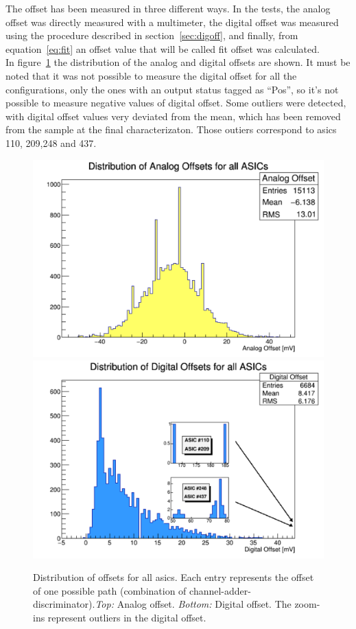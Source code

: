 \documentclass[main.tex]{subfiles}
\begin{document}
The offset has been measured in three different ways. In the tests, the analog offset was directly measured with a multimeter, the digital offset was measured using the procedure described in section~\ref{sec:digoff},
and finally, from equation~\ref{eq:fit} an offset value that will be called fit offset was calculated.\\
In figure~\ref{fig:offsetdist} the distribution of the analog and digital offsets are shown. It must be noted that it was not possible to measure the digital offset for all the configurations, only the ones with an output status tagged as ``Pos'', so it's not possible to measure negative values of digital offset. Some outliers were detected, with digital offset values very deviated from the mean, which has been removed from the sample at the final characterizaton. Those outiers correspond to \glspl{asic} 110, 209,248 and 437.
\begin{figure}[h]
  \centering
    \includegraphics[width=\textwidth]{./Pictures/analogdist.pdf}\\
  \endminipage
    \includegraphics[width=\textwidth]{./Pictures/digitaldist.pdf}
  \endminipage
  \caption{Distribution of offsets for all \glspl{asic}. Each entry represents the offset of one possible path (combination of channel-adder-discriminator).\textit{Top:} Analog offset. \textit{Bottom:} Digital offset. The zoom-ins represent outliers in the digital offset.}
  \label{fig:offsetdist}
\end{figure}
\end{document}
